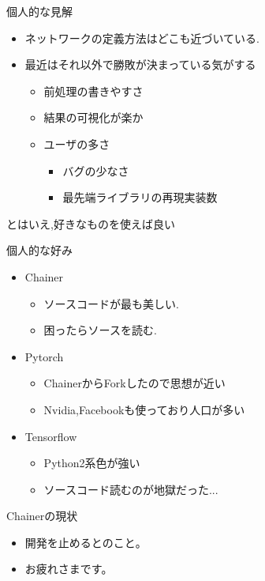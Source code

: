 \begin{frame}[fragile]{個人的な見解}
\begin{itemize}
\item ネットワークの定義方法はどこも近づいている.
\item 最近はそれ以外で勝敗が決まっている気がする
  \begin{itemize}
  \item  前処理の書きやすさ
  \item 結果の可視化が楽か
  \item ユーザの多さ
    \begin{itemize}
    \item  バグの少なさ
    \item 最先端ライブラリの再現実装数
    \end{itemize}
  \end{itemize}
\end{itemize}

とはいえ,好きなものを使えば良い
\end{frame}


\begin{frame}[fragile]{個人的な好み}
\begin{itemize}
\item  Chainer
  \begin{itemize}
  \item  ソースコードが最も美しい.
  \item 困ったらソースを読む.
  \end{itemize}
\item Pytorch
  \begin{itemize}
  \item  ChainerからForkしたので思想が近い
  \item  Nvidia,Facebookも使っており人口が多い
  \end{itemize}
\item Tensorflow
   \begin{itemize}
    \item Python2系色が強い
    \item ソースコード読むのが地獄だった...
   \end{itemize}
\end{itemize}
\end{frame}


\begin{frame}[fragile]{Chainerの現状}
\begin{itemize}
\item 開発を止めるとのこと。
\item お疲れさまです。
\end{itemize}
\end{frame}


